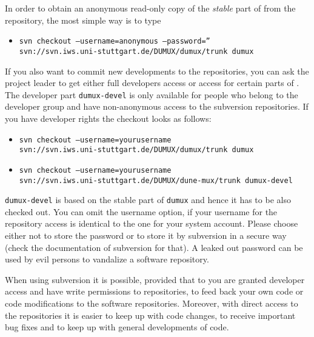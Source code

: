 
In order to obtain an anonymous read-only copy of the \emph{stable} part of \Dumux from the repository, the most simple way is to type
\begin{itemize}
\item \texttt{svn checkout --username=anonymous --password=''\\
    \hspace{4cm}  svn://svn.iws.uni-stuttgart.de/DUMUX/dumux/trunk dumux}
\end{itemize}

If you also want to commit new developments to the repositories, you can ask the \Dumux project leader to get either full developers access or access for certain parts of \Dumux. 
The developer part \texttt{dumux-devel} is only available for people who belong to the \Dumux developer group and have non-anonymous access to the subversion repositories. 
If you have developer rights the checkout looks as follows: 
\begin{itemize}
 \item \texttt{svn checkout --username=yourusername \\ 
      \hspace{4cm} svn://svn.iws.uni-stuttgart.de/DUMUX/dumux/trunk dumux}
 \item \texttt{svn checkout --username=yourusername \\
      \hspace{4cm} svn://svn.iws.uni-stuttgart.de/DUMUX/dune-mux/trunk dumux-devel}
\end{itemize} 
\texttt{dumux-devel} is based on the stable part of \texttt{dumux} and hence it has to be also checked out. 
You can omit the username option, if your username for the repository access is identical to the one for your system account.
Please choose either not to store the password or to store it by subversion in a secure way (check the documentation of subversion for that). 
A leaked out password can be used by evil persons to vandalize a software repository.

When using subversion it is possible, provided that to you are granted developer access and have write permissions to repositories, to feed back your own code or code modifications to the software repositories. 
Moreover, with direct access to the repositories it is easier to keep up with code changes, to receive important bug fixes and to keep up with general developments of code.

